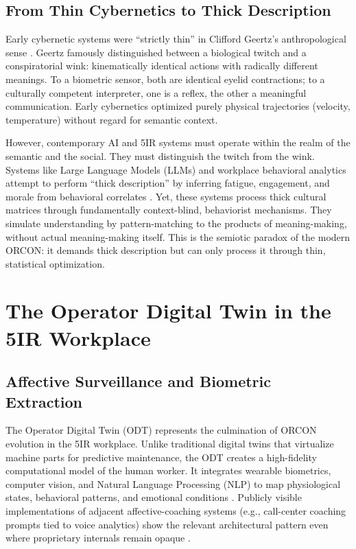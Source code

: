 \documentclass[11pt, a4paper]{article}
\begin{document}
\subsection{From Thin Cybernetics to Thick Description}
Early cybernetic systems were ``strictly thin'' in Clifford Geertz's anthropological sense \cite{geertz1973}. Geertz famously distinguished between a biological twitch and a conspiratorial wink: kinematically identical actions with radically different meanings. To a biometric sensor, both are identical eyelid contractions; to a culturally competent interpreter, one is a reflex, the other a meaningful communication. Early cybernetics optimized purely physical trajectories (velocity, temperature) without regard for semantic context.

However, contemporary AI and 5IR systems must operate within the realm of the semantic and the social. They must distinguish the twitch from the wink. Systems like Large Language Models (LLMs) and workplace behavioral analytics attempt to perform ``thick description'' by inferring fatigue, engagement, and morale from behavioral correlates \cite{crawford2021}. Yet, these systems process thick cultural matrices through fundamentally context-blind, behaviorist mechanisms. They simulate understanding by pattern-matching to the products of meaning-making, without actual meaning-making itself. This is the semiotic paradox of the modern ORCON: it demands thick description but can only process it through thin, statistical optimization.

\section{The Operator Digital Twin in the 5IR Workplace}

\subsection{Affective Surveillance and Biometric Extraction}
The Operator Digital Twin (ODT) represents the culmination of ORCON evolution in the 5IR workplace. Unlike traditional digital twins that virtualize machine parts for predictive maintenance, the ODT creates a high-fidelity computational model of the human worker. It integrates wearable biometrics, computer vision, and Natural Language Processing (NLP) to map physiological states, behavioral patterns, and emotional conditions \cite{zuboff2019}. Publicly visible implementations of adjacent affective-coaching systems (e.g., call-center coaching prompts tied to voice analytics) show the relevant architectural pattern even where proprietary internals remain opaque \cite{delagarza2019,cogito2023}.
\end{document}
